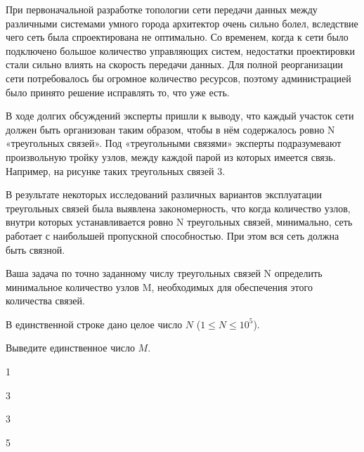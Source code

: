 
При первоначальной разработке топологии сети передачи данных между различными системами умного города архитектор очень сильно болел, вследствие чего сеть была спроектирована не оптимально. Со временем, когда к сети было подключено большое количество управляющих систем, недостатки проектировки стали сильно влиять на скорость передачи данных. Для полной реорганизации сети потребовалось бы огромное количество ресурсов, поэтому администрацией было принято решение исправлять то, что уже есть.

В ходе долгих обсуждений эксперты пришли к выводу, что каждый участок сети должен быть организован таким образом, чтобы в нём содержалось ровно N «треугольных связей». Под «треугольными связями» эксперты подразумевают произвольную тройку узлов, между каждой парой из которых имеется связь. Например, на рисунке таких треугольных связей 3.


В результате некоторых исследований различных вариантов эксплуатации треугольных связей была выявлена закономерность, что когда количество узлов, внутри которых устанавливается ровно N треугольных связей, минимально, сеть работает с наибольшей пропускной способностью. При этом вся сеть должна быть связной.

Ваша задача по точно заданному числу треугольных связей N определить минимальное количество узлов M, необходимых для обеспечения этого количества связей.


В единственной
строке дано целое число $ N $
($ 1 \le N \le 10^5 $).

\outputfmtSection

Выведите
единственное число $ M $.


\begin{myverbbox}[\small]{\vinput}
    1
\end{myverbbox}
\begin{myverbbox}[\small]{\voutput}
    3
\end{myverbbox}


\begin{myverbbox}[\small]{\vinput}
    3
\end{myverbbox}
\begin{myverbbox}[\small]{\voutput}
    5
\end{myverbbox}

